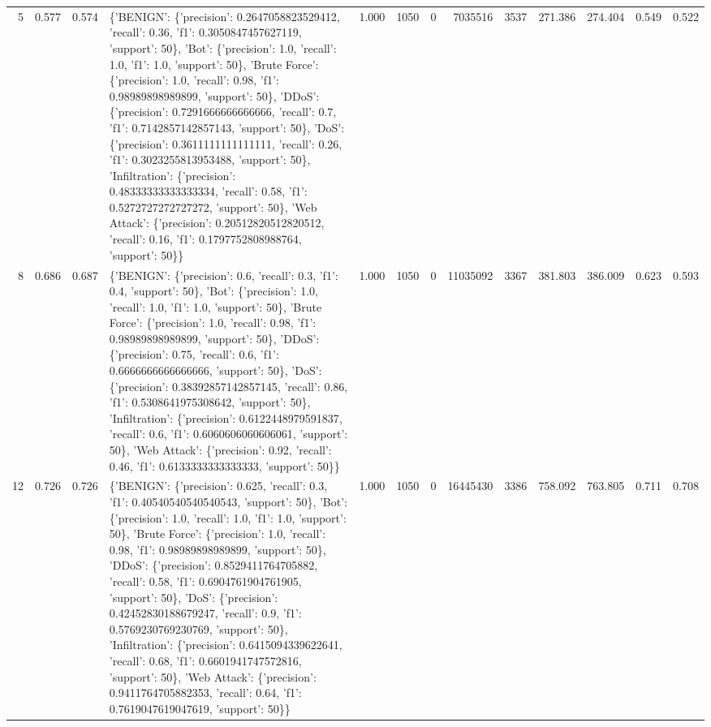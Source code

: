 \begin{tabular}{rrrlrrrrrrrrr}
5 & 0.577 & 0.574 & \{'BENIGN': \{'precision': 0.2647058823529412, 'recall': 0.36, 'f1': 0.3050847457627119, 'support': 50\}, 'Bot': \{'precision': 1.0, 'recall': 1.0, 'f1': 1.0, 'support': 50\}, 'Brute Force': \{'precision': 1.0, 'recall': 0.98, 'f1': 0.98989898989899, 'support': 50\}, 'DDoS': \{'precision': 0.7291666666666666, 'recall': 0.7, 'f1': 0.7142857142857143, 'support': 50\}, 'DoS': \{'precision': 0.3611111111111111, 'recall': 0.26, 'f1': 0.3023255813953488, 'support': 50\}, 'Infiltration': \{'precision': 0.48333333333333334, 'recall': 0.58, 'f1': 0.5272727272727272, 'support': 50\}, 'Web Attack': \{'precision': 0.20512820512820512, 'recall': 0.16, 'f1': 0.1797752808988764, 'support': 50\}\} & 1.000 & 1050 & 0 & 7035516 & 3537 & 271.386 & 274.404 & 0.549 & 0.522 \\
8 & 0.686 & 0.687 & \{'BENIGN': \{'precision': 0.6, 'recall': 0.3, 'f1': 0.4, 'support': 50\}, 'Bot': \{'precision': 1.0, 'recall': 1.0, 'f1': 1.0, 'support': 50\}, 'Brute Force': \{'precision': 1.0, 'recall': 0.98, 'f1': 0.98989898989899, 'support': 50\}, 'DDoS': \{'precision': 0.75, 'recall': 0.6, 'f1': 0.6666666666666666, 'support': 50\}, 'DoS': \{'precision': 0.38392857142857145, 'recall': 0.86, 'f1': 0.5308641975308642, 'support': 50\}, 'Infiltration': \{'precision': 0.6122448979591837, 'recall': 0.6, 'f1': 0.6060606060606061, 'support': 50\}, 'Web Attack': \{'precision': 0.92, 'recall': 0.46, 'f1': 0.6133333333333333, 'support': 50\}\} & 1.000 & 1050 & 0 & 11035092 & 3367 & 381.803 & 386.009 & 0.623 & 0.593 \\
12 & 0.726 & 0.726 & \{'BENIGN': \{'precision': 0.625, 'recall': 0.3, 'f1': 0.40540540540540543, 'support': 50\}, 'Bot': \{'precision': 1.0, 'recall': 1.0, 'f1': 1.0, 'support': 50\}, 'Brute Force': \{'precision': 1.0, 'recall': 0.98, 'f1': 0.98989898989899, 'support': 50\}, 'DDoS': \{'precision': 0.8529411764705882, 'recall': 0.58, 'f1': 0.6904761904761905, 'support': 50\}, 'DoS': \{'precision': 0.42452830188679247, 'recall': 0.9, 'f1': 0.5769230769230769, 'support': 50\}, 'Infiltration': \{'precision': 0.6415094339622641, 'recall': 0.68, 'f1': 0.6601941747572816, 'support': 50\}, 'Web Attack': \{'precision': 0.9411764705882353, 'recall': 0.64, 'f1': 0.7619047619047619, 'support': 50\}\} & 1.000 & 1050 & 0 & 16445430 & 3386 & 758.092 & 763.805 & 0.711 & 0.708 \\
\bottomrule
\end{tabular}
